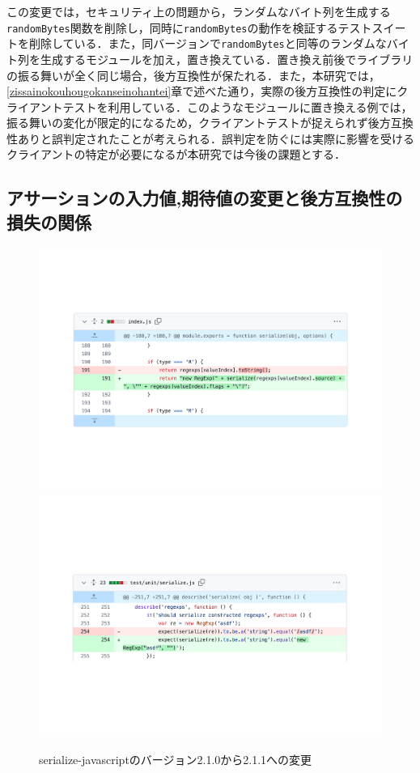 \documentclass[11pt,dvipdfmx]{jreport}
\begin{document}
この変更では，セキュリティ上の問題から，ランダムなバイト列を生成する{\verb|randomBytes|}関数を削除し，同時に{\verb|randomBytes|}の動作を検証するテストスイートを削除している．また，同バージョンで{\verb|randomBytes|}と同等のランダムなバイト列を生成するモジュールを加え，置き換えている．置き換え前後でライブラリの振る舞いが全く同じ場合，後方互換性が保たれる．また，本研究では，\ref{zissainokouhougokanseinohantei}章で述べた通り，実際の後方互換性の判定にクライアントテストを利用している．このようなモジュールに置き換える例では，振る舞いの変化が限定的になるため，クライアントテストが捉えられず後方互換性ありと誤判定されたことが考えられる．誤判定を防ぐには実際に影響を受けるクライアントの特定が必要になるが本研究では今後の課題とする．

\subsection{アサーションの入力値,期待値の変更と後方互換性の損失の関係}

\begin{figure}[t]
  \label{fig:rq1.change-test}
  \centering
  \includegraphics[width=1.0\linewidth]{fig/rq1/serialize-javascript/index.pdf}
  \includegraphics[width=1.0\linewidth]{fig/rq1/serialize-javascript/index.test.pdf}
  \caption{serialize-javascriptのバージョン2.1.0から2.1.1への変更}
\end{figure}
\end{document}
